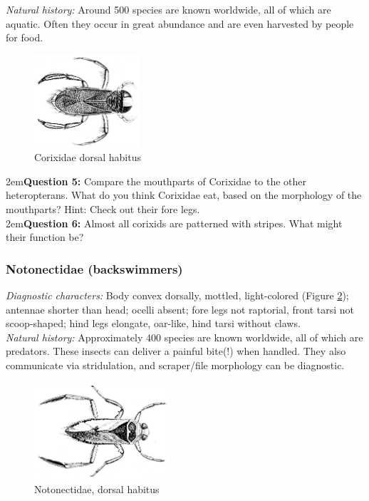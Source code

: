 \documentclass[letterpaper, 11pt]{article}
\begin{document}
\noindent{}\textit{Natural history:} Around 500 species are known worldwide, all of which are aquatic. Often they occur in great abundance and are even harvested by people for food. \\

\begin{figure}[ht!]
 \centering
 \includegraphics[width=0.35\textwidth]{CorixidHabitus}
 \caption{Corixidae dorsal habitus \citep[][Plate 7, Fig. 5]{bhl37902}}
 \label{fig:corix1}
\end{figure}

\hangindent2em\textbf{Question 5:} Compare the mouthparts of Corixidae to the other heteropterans. What do you think Corixidae eat, based on the morphology of the mouthparts? Hint: Check out their fore legs.\\

\hangindent2em\textbf{Question 6:} Almost all corixids are patterned with stripes. What might their function be?\\

\subsubsection{Notonectidae (backswimmers)}
\noindent{}\textit{Diagnostic characters:} Body convex dorsally, mottled, light-colored (Figure \ref{fig:notonect1}); antennae shorter than head; ocelli absent; fore legs not raptorial, front tarsi not scoop-shaped; hind legs elongate, oar-like, hind tarsi without claws.\\

\noindent{}\textit{Natural history:} Approximately 400 species are known worldwide, all of which are predators. These insects can deliver a painful bite(!) when handled. They also communicate via stridulation, and scraper/file morphology can be diagnostic.\\

\begin{figure}[ht!]
 \centering
 \includegraphics[width=0.45\textwidth]{NotonectidHabitus}
 \caption{Notonectidae, dorsal habitus \citep[][Plate 7, Fig. 2]{bhl37902}}
 \label{fig:notonect1}
\end{figure}
\end{document}
